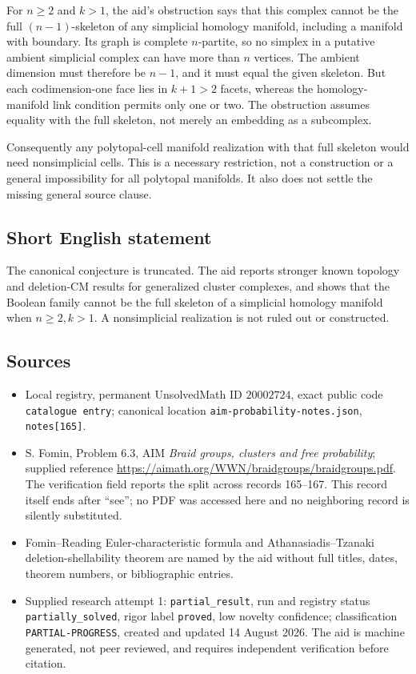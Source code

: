\documentclass[11pt]{article}
\begin{document}
For \(n\ge2\) and \(k>1\), the aid's obstruction says that this complex cannot be the full \((n-1)\)-skeleton of any simplicial homology manifold, including a manifold with boundary. Its graph is complete \(n\)-partite, so no simplex in a putative ambient simplicial complex can have more than \(n\) vertices. The ambient dimension must therefore be \(n-1\), and it must equal the given skeleton. But each codimension-one face lies in \(k+1>2\) facets, whereas the homology-manifold link condition permits only one or two. The obstruction assumes equality with the full skeleton, not merely an embedding as a subcomplex.

Consequently any polytopal-cell manifold realization with that full skeleton would need nonsimplicial cells. This is a necessary restriction, not a construction or a general impossibility for all polytopal manifolds. It also does not settle the missing general source clause.
\subsection{Short English statement}
The canonical conjecture is truncated. The aid reports stronger known topology and deletion-CM results for generalized cluster complexes, and shows that the Boolean family cannot be the full skeleton of a simplicial homology manifold when \(n\ge2,k>1\). A nonsimplicial realization is not ruled out or constructed.
\subsection{Sources}
\begin{itemize}
\item Local registry, permanent UnsolvedMath ID \(20002724\), exact public code \texttt{catalogue entry}; canonical location \texttt{aim-probability-notes.json}, \texttt{notes[165]}.
\item S. Fomin, Problem 6.3, AIM \emph{Braid groups, clusters and free probability}; supplied reference \url{https://aimath.org/WWN/braidgroups/braidgroups.pdf}. The verification field reports the split across records 165--167. This record itself ends after ``see''; no PDF was accessed here and no neighboring record is silently substituted.
\item Fomin--Reading Euler-characteristic formula and Athanasiadis--Tzanaki deletion-shellability theorem are named by the aid without full titles, dates, theorem numbers, or bibliographic entries.
\item Supplied research attempt 1: \texttt{partial\_result}, run and registry status \texttt{partially\_solved}, rigor label \texttt{proved}, low novelty confidence; classification \texttt{PARTIAL-PROGRESS}, created and updated 14 August 2026. The aid is machine generated, not peer reviewed, and requires independent verification before citation.
\end{itemize}
\end{document}
